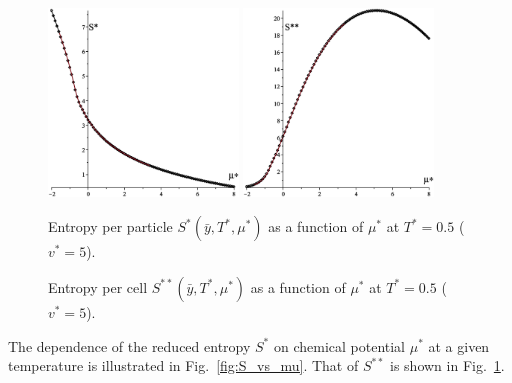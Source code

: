 \documentclass[12pt]{article}
\numberwithin{equation}{section}
\begin{document}
	\begin{figure}[htbp]
		\includegraphics[width=0.45\textwidth,angle=0]{S_vs_mu}
		\hfill
		\includegraphics[width=0.45\textwidth,angle=0]{SS_vs_mu}
		\\
		\parbox{0.45\textwidth}{\caption{\label{fig:S_vs_mu} Entropy per particle $S^{*}(\bar{y},T^*,\mu^*)$ as a function of $\mu^*$ at $T^*=0.5$ ($v^* = 5$).}}
		\hfill
		\parbox{0.45\textwidth}{\caption{\label{fig:SS_vs_mu} Entropy per cell $S^{**}(\bar{y},T^*,\mu^*)$ as a function of $\mu^*$ at $T^*=0.5$ ($v^* = 5$).}}
	\end{figure}
	
	The dependence of the reduced entropy $S^*$ on chemical potential $\mu^*$ at a given temperature is illustrated in Fig.~\ref{fig:S_vs_mu}. That of $S^{**}$ is shown in Fig.~\ref{fig:SS_vs_mu}.
	
\end{document}
